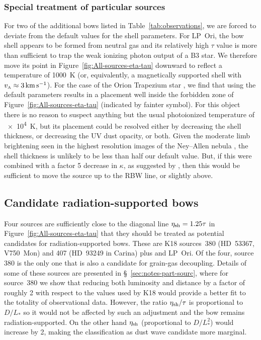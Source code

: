 \subsubsection{Special treatment of particular sources}
\label{sec:spec-treatm-part}

For two of the additional bows listed in Table~\ref{tab:observations},
we are forced to deviate from the default values for the shell
parameters.  For LP~Ori, the bow shell appears to be formed from
neutral gas \citep{ODell:2001c} and its relatively high \(\tau\) value
is more than sufficient to trap the weak ionizing photon output of a
B3 star.  We therefore move its point in
Figure~\ref{fig:All-sources-eta-tau} downward to reflect a temperature
of \SI{1000}{K} (or, equivalently, a magnetically supported shell with
\(v_{\scriptscriptstyle\text{A}} \approx \SI{3}{km.s^{-1}}\)).  For the case of the Orion
Trapezium star \thD{}, we find that using the default parameters
results in a placement well inside the forbidden zone of
Figure~\ref{fig:All-sources-eta-tau} (indicated by fainter symbol).
For this object there is no reason to suspect anything but the usual
photoionized temperature of \SI{e4}{K}, but its placement could be
resolved either by decreasing the shell thickness, or decreasing the
UV dust opacity, or both. Given the moderate limb brightening seen in
the highest resolution images of the Ney--Allen nebula
\citep{Robberto:2005a, Smith:2005a}, the shell thickness is unlikely
to be less than half our default value.  But, if this were combined
with a factor 5 decrease in \(\kappa\), as suggested by
\citet{Salgado:2016a}, then this would be sufficient to move the
source up to the RBW line, or slightly above.


\subsection{Candidate radiation-supported bows}
\label{sec:cand-radi-supp}

Four sources are sufficiently close to the diagonal line
\(\eta_{\text{sh}} = 1.25 \tau\) in Figure~\ref{fig:All-sources-eta-tau}
that they should be treated as potential candidates for
radiation-supported bows. These are K18 sources~380 (HD~53367,
V750~Mon) and 407 (HD~93249 in Carina) plus \thD{} and LP~Ori.  Of the
four, source 380 is the only one that is also a candidate for
grain-gas decoupling.  Details of some of these sources are presented
in \S~\ref{sec:notes-part-sourc}, where for source~380 we show that
reducing both luminosity and distance by a factor of roughly 2 with
respect to the values used by K18 would provide a better fit to the
totality of observational data.  However, the ratio
\(\eta_{\text{sh}} /\tau\) is proportional to \(D / L_*\) so it would not be
affected by such an adjustment and the bow remains
radiation-supported.  On the other hand \(\eta_{\text{sh}}\) (proportional
to \(D / L_*^2\)) would increase by 2, making the classification as
dust wave candidate more marginal.



